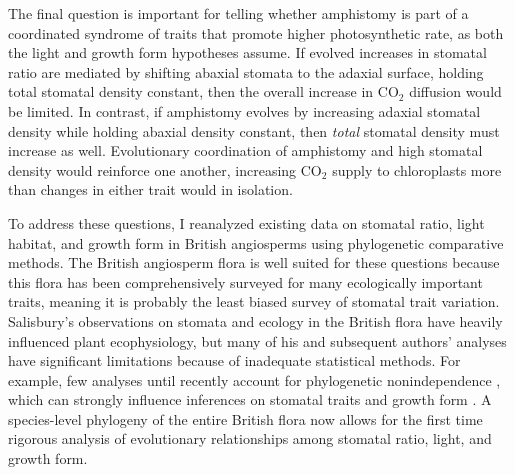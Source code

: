 \documentclass[12pt, oneside]{article}
\begin{document}
The final question is important for telling whether amphistomy is part of a coordinated syndrome of traits that promote higher photosynthetic rate, as both the light and growth form hypotheses assume. If evolved increases in stomatal ratio are mediated by shifting abaxial stomata to the adaxial surface, holding total stomatal density constant, then the overall increase in CO$_2$ diffusion would be limited. In contrast, if amphistomy evolves by increasing adaxial stomatal density while holding abaxial density constant, then \textit{total} stomatal density must increase as well. Evolutionary coordination of amphistomy and high stomatal density would reinforce one another, increasing CO$_2$ supply to chloroplasts more than changes in either trait would in isolation.

To address these questions, I reanalyzed existing data on stomatal ratio, light habitat, and growth form in British angiosperms \citep{Salisbury_1927, Fitter_Peat_1994a, BEF} using phylogenetic comparative methods. The British angiosperm flora is well suited for these questions because this flora has been comprehensively surveyed for many ecologically important traits, meaning it is probably the least biased survey of stomatal trait variation. Salisbury's observations on stomata and ecology in the British flora have heavily influenced plant ecophysiology, but many of his and subsequent authors' analyses have significant limitations because of inadequate statistical methods. For example, few analyses until recently account for phylogenetic nonindependence \citep{Felsenstein_1985}, which can strongly influence inferences on stomatal traits and growth form \citep[this study did not consider light]{Kelly_Beerling_1995}. A species-level phylogeny of the entire British flora \citep{Lim_etal_2014} now allows for the first time rigorous analysis of evolutionary relationships among stomatal ratio, light, and growth form. 


\end{document}
